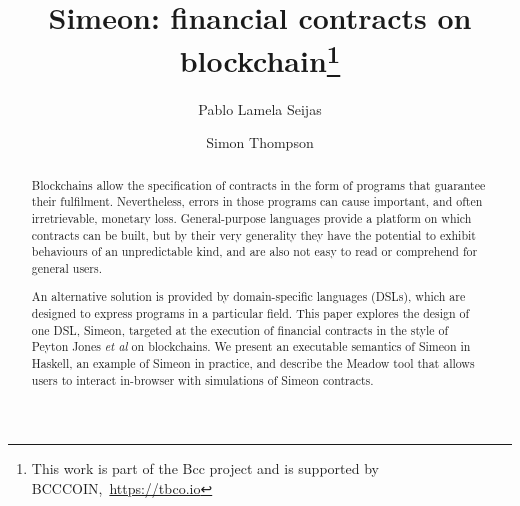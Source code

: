 \documentclass[runningheads]{llncs}
\begin{document}
%
%
\title {Simeon: financial contracts on blockchain\thanks{This work is part of the Bcc project 
and is supported by BCCCOIN,~\url{https://tbco.io}}}
%
%
\author{Pablo Lamela Seijas\\
\and Simon Thompson}
%
%


\begin{abstract}

Blockchains allow the specification of contracts in the form of programs that guarantee their fulfilment. 
Nevertheless, errors in those programs can cause important, and often irretrievable, monetary loss. General-purpose 
languages provide a platform on which contracts can be built, but by their very generality they have the potential to 
exhibit behaviours of an unpredictable kind, and are also not easy to read or comprehend for general users. 

An alternative solution is provided by domain-specific languages (DSLs), which are designed to express programs in a 
particular field. This paper explores the design of one DSL, Simeon, targeted at the execution of financial 
contracts in the style of Peyton Jones \emph{et al} on blockchains. We present an executable semantics of Simeon in 
Haskell, an example of Simeon in practice, and describe the Meadow tool that allows users to interact in-browser with 
simulations of Simeon contracts.

\end{abstract}



%
%


\maketitle

\end{document}

